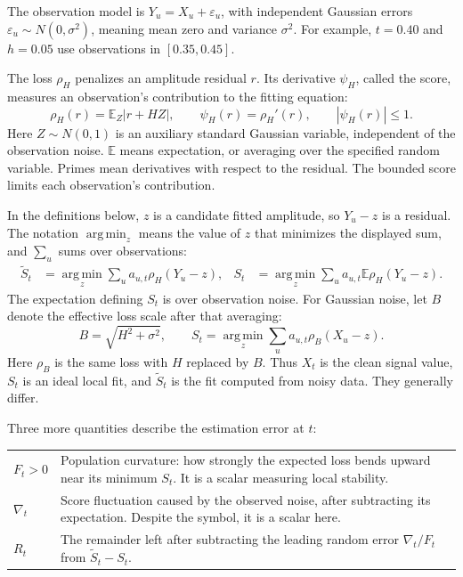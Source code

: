 \documentclass[11pt]{article}
\newcommand{\E}{\mathbb E}
\newcommand{\argmin}{\operatorname*{arg\,min}}
\begin{document}
The observation model is
\(Y_u=X_u+\varepsilon_u\), with independent Gaussian errors
\(\varepsilon_u\sim N(0,\sigma^2)\), meaning mean zero and variance
\(\sigma^2\).  For example, \(t=0.40\) and \(h=0.05\) use observations in
\([0.35,0.45]\).

The loss \(\rho_H\) penalizes an amplitude residual \(r\).
Its derivative \(\psi_H\), called the score, measures an observation's
contribution to the fitting equation:
\[
  \rho_H(r)=\E_Z|r+HZ|,\qquad \psi_H(r)=\rho_H'(r),\qquad |\psi_H(r)|\leq1.
\]
Here \(Z\sim N(0,1)\) is an auxiliary standard Gaussian variable, independent
of the observation noise.  \(\E\) means expectation, or averaging over the
specified random variable.  Primes mean derivatives with respect to the
residual.  The bounded score limits each observation's contribution.

In the definitions below, \(z\) is a candidate fitted amplitude, so
\(Y_u-z\) is a residual.  The notation \(\argmin_z\) means the value of
\(z\) that minimizes the displayed sum, and \(\sum_u\) sums over observations:
\begin{align*}
  \widetilde S_t&=\argmin_z\sum_u a_{u,t}\rho_H(Y_u-z),
  & S_t&=\argmin_z\sum_u a_{u,t}\E\rho_H(Y_u-z).
\end{align*}
The expectation defining \(S_t\) is over observation noise.  For Gaussian
noise, let \(B\) denote the effective loss scale after that averaging:
\[
  B=\sqrt{H^2+\sigma^2},\qquad
  S_t=\argmin_z\sum_u a_{u,t}\rho_B(X_u-z).
\]
Here \(\rho_B\) is the same loss with \(H\) replaced by \(B\).  Thus
\(X_t\) is the clean signal value, \(S_t\) is an ideal local fit, and
\(\widetilde S_t\) is the fit computed from noisy data.  They generally differ.

\newpage

Three more quantities describe the estimation error at \(t\):

{\small
\renewcommand{\arraystretch}{1.1}
\begin{tabular}{@{}p{27mm}p{\dimexpr\linewidth-27mm-2\tabcolsep\relax}@{}}
\(F_t>0\) & Population curvature: how strongly the expected loss bends upward
near its minimum \(S_t\).  It is a scalar measuring local stability. \\
\(\nabla_t\) & Score fluctuation caused by the observed noise, after
subtracting its expectation.  Despite the symbol, it is a scalar here. \\
\(R_t\) & The remainder left after subtracting the leading random error
\(\nabla_t/F_t\) from \(\widetilde S_t-S_t\). \\
\end{tabular}}
\end{document}
